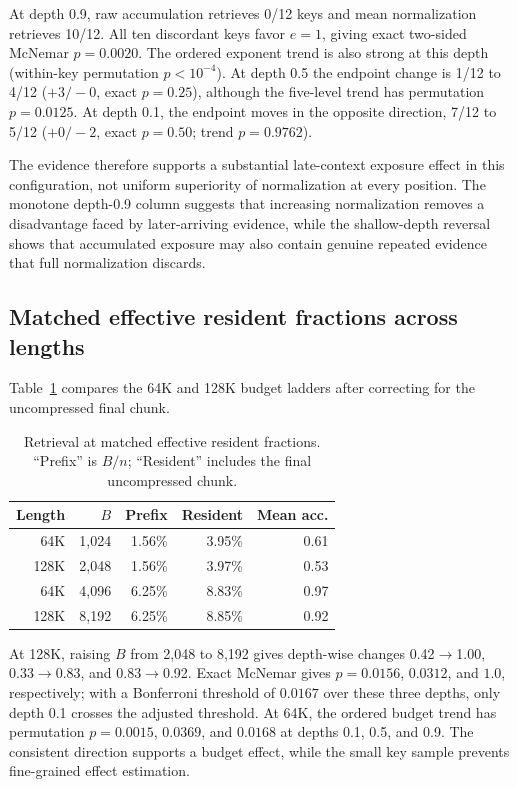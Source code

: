 \documentclass[10pt,twocolumn]{article}
\begin{document}
At depth 0.9, raw accumulation retrieves 0/12 keys and mean normalization retrieves 10/12. All ten discordant keys favor $e=1$, giving exact two-sided McNemar $p=0.0020$. The ordered exponent trend is also strong at this depth (within-key permutation $p<10^{-4}$). At depth 0.5 the endpoint change is 1/12 to 4/12 ($+3/-0$, exact $p=0.25$), although the five-level trend has permutation $p=0.0125$. At depth 0.1, the endpoint moves in the opposite direction, 7/12 to 5/12 ($+0/-2$, exact $p=0.50$; trend $p=0.9762$).

The evidence therefore supports a substantial late-context exposure effect in this configuration, not uniform superiority of normalization at every position. The monotone depth-0.9 column suggests that increasing normalization removes a disadvantage faced by later-arriving evidence, while the shallow-depth reversal shows that accumulated exposure may also contain genuine repeated evidence that full normalization discards.

\subsection{Matched effective resident fractions across lengths}
Table~\ref{tab:length} compares the 64K and 128K budget ladders after correcting for the uncompressed final chunk.

\begin{table}[t]
\centering
\caption{Retrieval at matched effective resident fractions. ``Prefix'' is $B/n$; ``Resident'' includes the final uncompressed chunk.}
\label{tab:length}
\small
\begin{tabular}{rrrrr}
\toprule
Length & $B$ & Prefix & Resident & Mean acc. \\
\midrule
64K & 1,024 & 1.56\% & 3.95\% & 0.61 \\
128K & 2,048 & 1.56\% & 3.97\% & 0.53 \\
64K & 4,096 & 6.25\% & 8.83\% & 0.97 \\
128K & 8,192 & 6.25\% & 8.85\% & 0.92 \\
\bottomrule
\end{tabular}
\end{table}

At 128K, raising $B$ from 2,048 to 8,192 gives depth-wise changes 0.42$\rightarrow$1.00, 0.33$\rightarrow$0.83, and 0.83$\rightarrow$0.92. Exact McNemar gives $p=0.0156$, $0.0312$, and $1.0$, respectively; with a Bonferroni threshold of $0.0167$ over these three depths, only depth 0.1 crosses the adjusted threshold. At 64K, the ordered budget trend has permutation $p=0.0015$, $0.0369$, and $0.0168$ at depths 0.1, 0.5, and 0.9. The consistent direction supports a budget effect, while the small key sample prevents fine-grained effect estimation.
\end{document}
